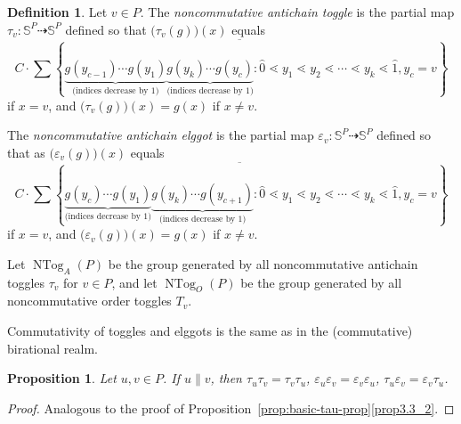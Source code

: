 \documentclass[10pt]{amsart}
\newtheorem{prop}[theo]{Proposition}
\theoremstyle{definition}
\newtheorem{defi}[theo]{Definition}
\newcommand{\defn}[1]{\emph{#1}}
\newcommand{\bbs}{\mathbb{S}}
\newcommand{\e}{\varepsilon}
\newcommand{\dra}{\dashrightarrow}
\DeclareMathOperator{\ntog}{NTog}
\begin{document}
\begin{defi}
Let $v\in P$. The \defn{noncommutative antichain toggle} is the partial map $\tau_v:\bbs^P \dra \bbs^P$ defined so that $\big(\tau_v(g)\big)(x)$ equals
\[
C \cdot \overline{
\sum\left\{\underbrace{g(y_{c-1})\cdots g(y_1)}_{\text{(indices decrease by 1)}}
\underbrace{g(y_{k})\cdots g(y_c)}_{\text{(indices decrease by 1)}} : \widehat{0}\lessdot y_1\lessdot y_2 \lessdot
\cdots \lessdot y_k\lessdot \widehat{1}, y_c=v
\right\}}
\]
if $x=v$, and $\big(\tau_v(g)\big)(x)=g(x)$ if $x\not=v$.

The \defn{noncommutative antichain elggot} is the partial map $\e_v:\bbs^P \dra \bbs^P$ defined so that as $\big(\e_v(g)\big)(x)$ equals
\[
C \cdot \overline{
\sum\left\{\underbrace{g(y_c)\cdots g(y_1)}_{\text{(indices decrease by 1)}}
\underbrace{g(y_{k})\cdots g(y_{c+1})}_{\text{(indices decrease by 1)}} : \widehat{0}\lessdot y_1\lessdot y_2
\lessdot
\cdots \lessdot y_k\lessdot \widehat{1}, y_c=v
\right\}}
\] 
if $x=v$, and $\big(\e_v(g)\big)(x)=g(x)$ if $x\not=v$.

Let $\ntog_A(P)$ be the group generated by all noncommutative antichain toggles $\tau_v$ for $v\in P$, and let $\ntog_O(P)$ be the group generated by all noncommutative order toggles $T_v$.
\end{defi}

Commutativity of toggles and elggots is the same as in the (commutative) birational realm.

\begin{prop}
Let $u,v\in P$. If $u \parallel v$, then
$\tau_u \tau_v= \tau_v \tau_u$, $ \e_u \e_v= \e_v \e_u$, $ \tau_u \e_v= \e_v \tau_u$.
\end{prop}
\begin{proof}
Analogous to the proof of Proposition~\ref{prop:basic-tau-prop}\ref{prop3.3_2}. 
\end{proof}
\end{document}
